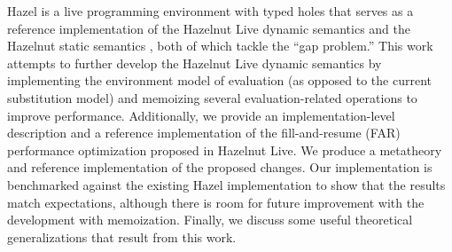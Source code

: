 
\noindent{}Hazel is a live programming environment with typed holes that serves as a reference implementation of the Hazelnut Live dynamic semantics \cite{conf/popl/Hazelnut17} and the Hazelnut static semantics \cite{conf/popl/HazelnutLive19}, both of which tackle the ``gap problem.'' This work attempts to further develop the Hazelnut Live dynamic semantics by implementing the environment model of evaluation (as opposed to the current substitution model) and memoizing several evaluation-related operations to improve performance. Additionally, we provide an implementation-level description and a reference implementation of the fill-and-resume (FAR) performance optimization proposed in Hazelnut Live. We produce a metatheory and reference implementation of the proposed changes. Our implementation is benchmarked against the existing Hazel implementation to show that the results match expectations, although there is room for future improvement with the development with memoization. Finally, we discuss some useful theoretical generalizations that result from this work.

